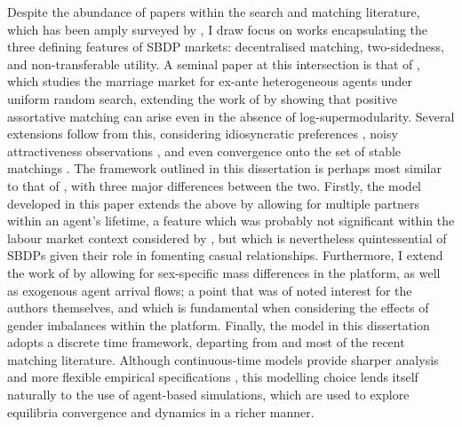 Despite the abundance of papers within the search and matching literature, which has been amply surveyed by \cite{chade2017sorting}, I draw focus on works encapsulating the three defining features of SBDP markets: decentralised matching, two-sidedness, and non-transferable utility. 
A seminal paper at this intersection is that of \cite{burdett1997marriage}, which studies the marriage market for ex-ante heterogeneous agents under uniform random search, extending the work of \cite{becker1973theory} by showing that positive assortative matching can arise even in the absence of log-supermodularity.
Several extensions follow from this, considering idiosyncratic preferences \citep{burdett1998two}, noisy attractiveness observations \citep{chade2006matching}, and even convergence onto the set of stable matchings \citep{adachi2003search}. 
The framework outlined in this dissertation is perhaps most similar to that of \cite{burdett1998two}, with three major differences between the two. 
Firstly, the model developed in this paper extends the above by allowing for multiple partners within an agent's lifetime, a feature which was probably not significant within the labour market context considered by \cite{burdett1998two}, but which is nevertheless quintessential of SBDPs given their role in fomenting casual relationships.
Furthermore, I extend the work of \citeauthor{burdett1998two} by allowing for sex-specific mass differences in the platform, as well as exogenous agent arrival flows; a point that was of noted interest for the authors themselves, and which is fundamental when considering the effects of gender imbalances within the platform. 
Finally, the model in this dissertation adopts a discrete time framework, departing from \cite{burdett1998two} and most of the recent matching literature. 
Although continuous-time models provide sharper analysis and more flexible empirical specifications \citep{burdett1999long}, this modelling choice lends itself naturally to the use of agent-based simulations, which are used to explore equilibria convergence and dynamics in a richer manner.

